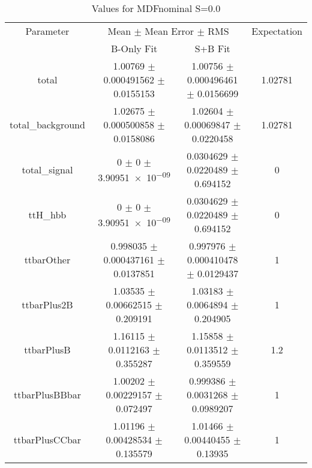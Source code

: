 \begin{table}
\centering
\caption{Values for MDFnominal S=0.0}
\begin{tabular}{cccc}
\toprule
Parameter & \multicolumn{2}{c}{Mean $\pm$ Mean Error $\pm$ RMS} & Expectation\\
 & B-Only Fit & S+B Fit & \\
\midrule
total & \num{1.00769} $\pm$ \num{0.000491562} $\pm$ \num{0.0155153} & \num{1.00756} $\pm$ \num{0.000496461} $\pm$ \num{0.0156699} & \num{1.02781}\\
total\_background & \num{1.02675} $\pm$ \num{0.000500858} $\pm$ \num{0.0158086} & \num{1.02604} $\pm$ \num{0.00069847} $\pm$ \num{0.0220458} & \num{1.02781}\\
total\_signal & \num{0} $\pm$ \num{0} $\pm$ \num{3.90951e-09} & \num{0.0304629} $\pm$ \num{0.0220489} $\pm$ \num{0.694152} & \num{0}\\
ttH\_hbb & \num{0} $\pm$ \num{0} $\pm$ \num{3.90951e-09} & \num{0.0304629} $\pm$ \num{0.0220489} $\pm$ \num{0.694152} & \num{0}\\
ttbarOther & \num{0.998035} $\pm$ \num{0.000437161} $\pm$ \num{0.0137851} & \num{0.997976} $\pm$ \num{0.000410478} $\pm$ \num{0.0129437} & \num{1}\\
ttbarPlus2B & \num{1.03535} $\pm$ \num{0.00662515} $\pm$ \num{0.209191} & \num{1.03183} $\pm$ \num{0.0064894} $\pm$ \num{0.204905} & \num{1}\\
ttbarPlusB & \num{1.16115} $\pm$ \num{0.0112163} $\pm$ \num{0.355287} & \num{1.15858} $\pm$ \num{0.0113512} $\pm$ \num{0.359559} & \num{1.2}\\
ttbarPlusBBbar & \num{1.00202} $\pm$ \num{0.00229157} $\pm$ \num{0.072497} & \num{0.999386} $\pm$ \num{0.0031268} $\pm$ \num{0.0989207} & \num{1}\\
ttbarPlusCCbar & \num{1.01196} $\pm$ \num{0.00428534} $\pm$ \num{0.135579} & \num{1.01466} $\pm$ \num{0.00440455} $\pm$ \num{0.13935} & \num{1}\\
\bottomrule
\end{tabular}
\end{table}